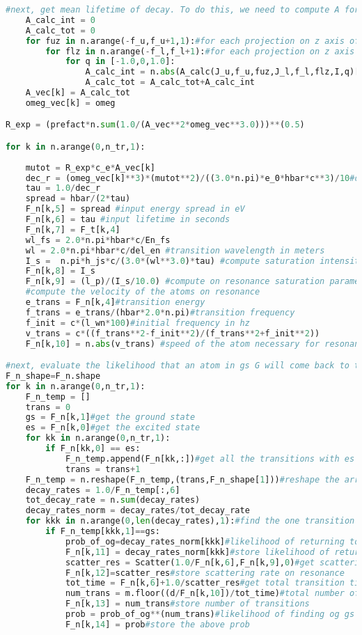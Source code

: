 {\begin{lstlisting}[language=Python,breaklines]
	#next, get mean lifetime of decay. To do this, we need to compute A for each (f_uz,f_lz,q) This is spontaneous emission
	A_calc_int = 0
	A_calc_tot = 0
	for fuz in n.arange(-f_u,f_u+1,1):#for each projection on z axis of top F state
		for flz in n.arange(-f_l,f_l+1):#for each projection on z axis of lower F state
			for q in [-1.0,0,1.0]:
				A_calc_int = n.abs(A_calc(J_u,f_u,fuz,J_l,f_l,flz,I,q)[0])
				A_calc_tot = A_calc_tot+A_calc_int
	A_vec[k] = A_calc_tot
	omeg_vec[k] = omeg

R_exp = (prefact*n.sum(1.0/(A_vec**2*omeg_vec**3.0)))**(0.5)

for k in n.arange(0,n_tr,1):
	
	mutot = R_exp*c_e*A_vec[k]
	dec_r = (omeg_vec[k]**3)*(mutot**2)/((3.0*n.pi)*e_0*hbar*c**3)/10#decay rate in Hz
	tau = 1.0/dec_r
	spread = hbar/(2*tau) 
	F_n[k,5] = spread #input energy spread in eV
	F_n[k,6] = tau #input lifetime in seconds
	F_n[k,7] = F_t[k,4]
	wl_fs = 2.0*n.pi*hbar*c/En_fs
	wl = 2.0*n.pi*hbar*c/del_en #transition wavelength in meters
	I_s =  n.pi*h_js*c/(3.0*(wl**3.0)*tau) #compute saturation intensity pg. 25 in Metcalf, in W
	F_n[k,8] = I_s
	F_n[k,9] = (l_p)/(I_s/10.0) #compute on resonance saturation parameter pg. 25 in metcalf
	#compute the velocity of the atoms on resonance
	e_trans = F_n[k,4]#transition energy
	f_trans = e_trans/(hbar*2.0*n.pi)#transition frequency
	f_init = c*(l_wn*100)#initial frequency in hz
	v_trans = c*((f_trans**2-f_init**2)/(f_trans**2+f_init**2))
	F_n[k,10] = n.abs(v_trans) #speed of the atom necessary for resonance

#next, evaluate the likelihood that an atom in gs G will come back to that state after being excited
F_n_shape=F_n.shape
for k in n.arange(0,n_tr,1):
	F_n_temp = []
	trans = 0
	gs = F_n[k,1]#get the ground state
	es = F_n[k,0]#get the excited state
	for kk in n.arange(0,n_tr,1):
		if F_n[kk,0] == es:
			F_n_temp.append(F_n[kk,:])#get all the transitions with es as excited state
			trans = trans+1
	F_n_temp = n.reshape(F_n_temp,(trans,F_n_shape[1]))#reshape the array
	decay_rates = 1.0/F_n_temp[:,6]
	tot_decay_rate = n.sum(decay_rates)
	decay_rates_norm = decay_rates/tot_decay_rate
	for kkk in n.arange(0,len(decay_rates),1):#find the one transition that allows for the same gs
		if F_n_temp[kkk,1]==gs:
			prob_of_og=decay_rates_norm[kkk]#likelihood of returning to og ground state
			F_n[k,11] = decay_rates_norm[kkk]#store likelihood of returning to og ground state
			scatter_res = Scatter(1.0/F_n[k,6],F_n[k,9],0)#get scattering rate on resonance
			F_n[k,12]=scatter_res#store scattering rate on resonance
			tot_time = F_n[k,6]+1.0/scatter_res#get total transition time = scattering time + lifetime
			num_trans = m.floor((d/F_n[k,10])/tot_time)#total number of transitions rounded down
			F_n[k,13] = num_trans#store number of transitions
			prob = prob_of_og**(num_trans)#likelihood of finding og gs when you enter LCR
			F_n[k,14] = prob#store the above prob



\end{lstlisting}}

